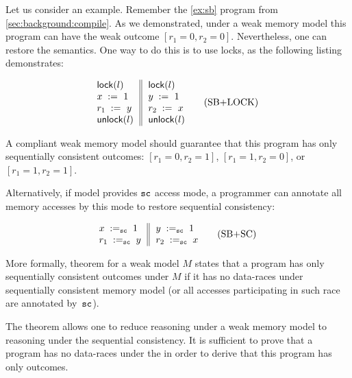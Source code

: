 Let us consider an example. 
Remember the \ref{ex:sb} program from \cref{sec:background:compile}.
As we demonstrated, under a weak memory model 
this program can have the weak outcome ${[r_1=0, r_2=0]}$.
Nevertheless, one can restore the \SC semantics.
One way to do this is to use locks, as the following listing demonstrates:

\begin{equation*}
\inarrII{
   \lockInst{l}         \\
   \writeInst{}{x}{1}   \\
   \readInst{}{r_1}{y}  \\
   \unlockInst{l}       \\
}{
   \lockInst{l}         \\
   \writeInst{}{y}{1}   \\
   \readInst{}{r_2}{x}  \\
   \unlockInst{l}       \\
}
\tag{SB+LOCK}\label{ex:sb-lock}
\end{equation*}

A \DRF compliant weak memory model should guarantee 
that this program has only sequentially consistent outcomes:
${[r_1=0, r_2=1]}$, ${[r_1=1,r_2=0]}$, or ${[r_1=1,r_2=1]}$.

Alternatively, if model provides ${\mathtt{sc}}$ access mode, 
a programmer can annotate all memory accesses by this mode
to restore sequential consistency:  
 
\begin{equation*}
\inarrII{
   \writeInst{\sco}{x}{1}   \\
   \readInst{\sco}{r_1}{y}  \\
}{
   \writeInst{\sco}{y}{1}   \\
   \readInst{\sco}{r_2}{x}  \\
}
\tag{SB+SC}\label{ex:sb-sc}
\end{equation*}

More formally, \DRF theorem for a weak model $M$ states that 
a program has only sequentially consistent outcomes under $M$
if it has no data-races under sequentially consistent memory model
(or all accesses participating in such race are annotated by~${\mathtt{sc}}$).

The \DRF theorem allows one to reduce reasoning under a weak memory model
to reasoning under the sequential consistency.
It is sufficient to prove that a program has no data-races under the \SC
in order to derive that this program has only \SC outcomes. 


